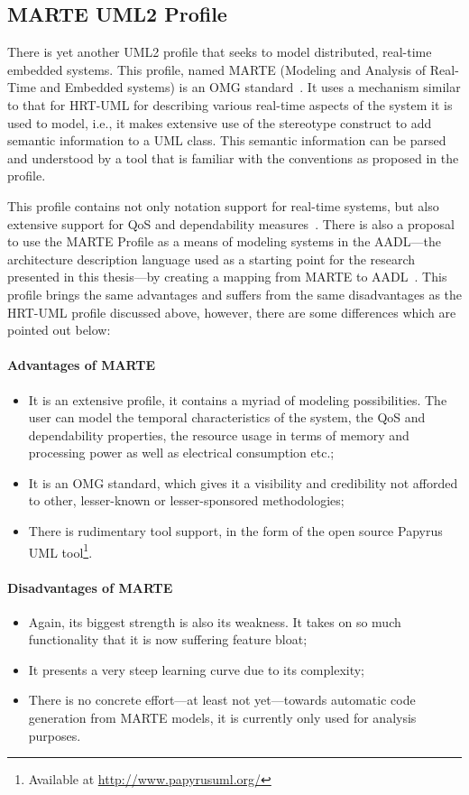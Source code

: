 \subsection{MARTE UML2 Profile}
There is yet another UML2 profile that seeks to model distributed,
real-time embedded systems. This profile, named MARTE (Modeling and
Analysis of Real-Time and Embedded systems) is an OMG
standard~\cite{omg-marte}. It uses a mechanism similar to that for
HRT-UML for describing various real-time aspects of the system it is
used to model, i.e., it makes extensive use of the stereotype
construct to add semantic information to a UML class. This semantic
information can be parsed and understood by a tool that is familiar
with the conventions as proposed in the profile.

This profile contains not only notation support for real-time systems,
but also extensive support for QoS and dependability
measures~\cite{bernardi@wosp07}. There is also a proposal to use the
MARTE Profile as a means of modeling systems in the AADL---the
architecture description language used as a starting point for the
research presented in this thesis---by creating a mapping from MARTE
to AADL~\cite{gerard@iceccs07}. This profile brings the same
advantages and suffers from the same disadvantages as the HRT-UML
profile discussed above, however, there are some differences which are
pointed out below:

\paragraph{Advantages of MARTE}
\begin{itemize}
\item{It is an extensive profile, it contains a myriad of modeling
  possibilities. The user can model the temporal characteristics of
  the system, the QoS and dependability properties, the resource usage
  in terms of memory and processing power as well as electrical
  consumption etc.;}
\item{It is an OMG standard, which gives it a visibility and
  credibility not afforded to other, lesser-known or lesser-sponsored
  methodologies;}
\item{There is rudimentary tool support, in the form of the open
  source Papyrus UML tool\footnote{Available at
    \url{http://www.papyrusuml.org/}}.}
\end{itemize}
\paragraph{Disadvantages of MARTE}
\begin{itemize}
\item{Again, its biggest strength is also its weakness. It takes on so
  much functionality that it is now suffering feature bloat;}
\item{It presents a very steep learning curve due to its complexity;}
\item{There is no concrete effort---at least not yet---towards
  automatic code generation from MARTE models, it is currently only
  used for analysis purposes.}
\end{itemize}

